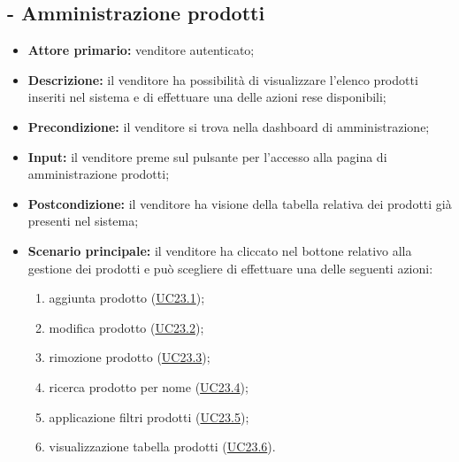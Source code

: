 \subsection{ - Amministrazione prodotti}
\begin{itemize}
    \item \textbf{Attore primario:} venditore autenticato;
    \item \textbf{Descrizione:} il venditore ha possibilità di visualizzare l’elenco prodotti inseriti nel sistema e di effettuare una delle azioni rese disponibili;
    \item \textbf{Precondizione:} il venditore si trova nella dashboard di amministrazione;
    \item \textbf{Input:} il venditore preme sul pulsante per l'accesso alla pagina di amministrazione prodotti;
    \item \textbf{Postcondizione:} il venditore ha visione della tabella relativa dei prodotti già presenti nel sistema;
    \item \textbf{Scenario principale:} il venditore ha cliccato nel bottone relativo alla gestione dei prodotti e può scegliere di effettuare una delle seguenti azioni:
          \begin{enumerate}
              \item aggiunta prodotto (\hyperref[UC23.1]{UC23.1});
              \item modifica prodotto (\hyperref[UC23.2]{UC23.2});
              \item rimozione prodotto (\hyperref[UC23.3]{UC23.3});
              \item ricerca prodotto per nome (\hyperref[UC23.4]{UC23.4});
              \item applicazione filtri prodotti (\hyperref[UC23.5]{UC23.5});
              \item visualizzazione tabella prodotti (\hyperref[UC23.6]{UC23.6}).
          \end{enumerate}
\end{itemize}

\stepsubUserCase
